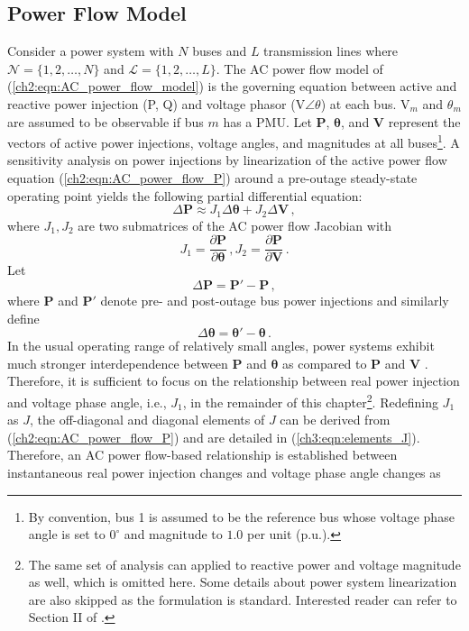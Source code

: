 \subsection{Power Flow Model}
Consider a power system with $N$ buses and $L$ transmission lines where $\mathcal{N} = \{1, 2, \dots, N\}$ and $\mathcal{L} = \{1, 2, \dots, L\}$. The AC power flow model of (\ref{ch2:eqn:AC_power_flow_model}) is the governing equation between active and reactive power injection (P, Q) and voltage phasor (V$\angle\theta$) at each bus. $\text{V}_m$ and $\theta_m$ are assumed to be observable if bus $m$ has a PMU. Let \textbf{P}, $\boldsymbol{\theta}$, and \textbf{V} represent the vectors of active power injections, voltage angles, and magnitudes at all buses\footnote{By convention, bus 1 is assumed to be the reference bus whose voltage phase angle is set to $0^\circ$ and magnitude to $1.0$ per unit (p.u.).}. 
A sensitivity analysis on power injections by linearization of the active power flow equation (\ref{ch2:eqn:AC_power_flow_P}) around a pre-outage steady-state operating point yields the following partial differential equation: 
\begin{equation}
\label{ch5:eqn:ac_decoupled_jacobian}
\Delta \textbf{P} \approx J_1 \Delta\boldsymbol{\theta} + J_2 \Delta\textbf{V}\,,
\end{equation}
where ${J}_1, {J}_2$ are two submatrices of the AC power flow Jacobian with 
\begin{equation}
\label{ch5:eqn:ac_jacobian}
{J}_1 = \frac{\partial \textbf{P}}{\partial \boldsymbol{\theta}} \,, 
{J}_2 = \frac{\partial \textbf{P}}{\partial \textbf{V}} \,.
\end{equation}
Let 
$$
\Delta \textbf{P} = \textbf{P}' - \textbf{P} \,,
$$ where $\textbf{P}$ and $\textbf{P}'$ denote pre- and post-outage bus power injections and similarly define
$$
\Delta\boldsymbol{\theta} = \boldsymbol{\theta}' - \boldsymbol{\theta} \,.
$$
In the usual operating range of relatively small angles, power systems exhibit much stronger interdependence between \textbf{P} and $\boldsymbol{\theta}$ as compared to \textbf{P} and \textbf{V} \cite{murty2017power}. Therefore, it is sufficient to focus on the relationship between real power injection and voltage phase angle, i.e., ${J}_1$, in the remainder of this chapter\footnote{The same set of analysis can applied to reactive power and voltage magnitude as well, which is omitted here. Some details about power system linearization are also skipped as the formulation is standard. Interested reader can refer to Section II of \cite{yang2020control}.}. Redefining ${J}_1$ as ${J}$, the off-diagonal and diagonal elements of ${J}$ can be derived from (\ref{ch2:eqn:AC_power_flow_P}) and are detailed in (\ref{ch3:eqn:elements_J}). Therefore, an AC power flow-based relationship is established between instantaneous real power injection changes and voltage phase angle changes as 
